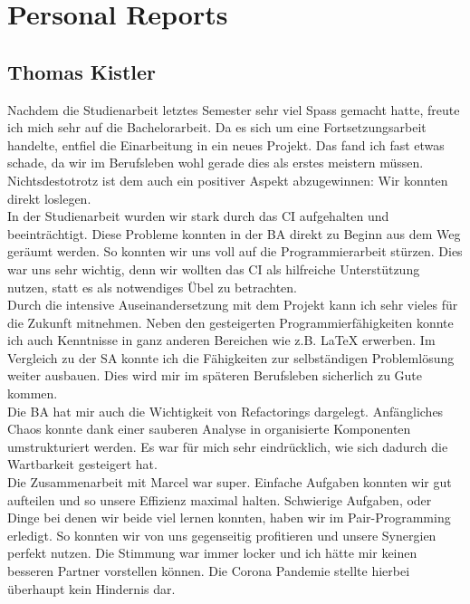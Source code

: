 \section*{Personal Reports}

\subsection*{Thomas Kistler}
Nachdem die Studienarbeit letztes Semester sehr viel Spass gemacht hatte, freute ich mich sehr auf die Bachelorarbeit.
Da es sich um eine Fortsetzungsarbeit handelte, entfiel die Einarbeitung in ein neues Projekt.
Das fand ich fast etwas schade, da wir im Berufsleben wohl gerade dies als erstes meistern müssen.
Nichtsdestotrotz ist dem auch ein positiver Aspekt abzugewinnen:
Wir konnten direkt loslegen.\\

In der Studienarbeit wurden wir stark durch das CI aufgehalten und beeinträchtigt.
Diese Probleme konnten in der BA direkt zu Beginn aus dem Weg geräumt werden.
So konnten wir uns voll auf die Programmierarbeit stürzen.
Dies war uns sehr wichtig, denn wir wollten das CI als hilfreiche Unterstützung nutzen, statt es als notwendiges Übel zu betrachten.\\

Durch die intensive Auseinandersetzung mit dem Projekt kann ich sehr vieles für die Zukunft mitnehmen.
Neben den gesteigerten Programmierfähigkeiten konnte ich auch Kenntnisse in ganz anderen Bereichen wie z.B. LaTeX erwerben.
Im Vergleich zu der SA konnte ich die Fähigkeiten zur selbständigen Problemlösung weiter ausbauen.
Dies wird mir im späteren Berufsleben sicherlich zu Gute kommen.\\

Die BA hat mir auch die Wichtigkeit von Refactorings dargelegt.
Anfängliches Chaos konnte dank einer sauberen Analyse in organisierte Komponenten umstrukturiert werden.
Es war für mich sehr eindrücklich, wie sich dadurch die Wartbarkeit gesteigert hat.\\

Die Zusammenarbeit mit Marcel war super.
Einfache Aufgaben konnten wir gut aufteilen und so unsere Effizienz maximal halten.
Schwierige Aufgaben, oder Dinge bei denen wir beide viel lernen konnten, haben wir im Pair-Programming erledigt.
So konnten wir von uns gegenseitig profitieren und unsere Synergien perfekt nutzen.
Die Stimmung war immer locker und ich hätte mir keinen besseren Partner vorstellen können.
Die Corona Pandemie stellte hierbei überhaupt kein Hindernis dar.\\

